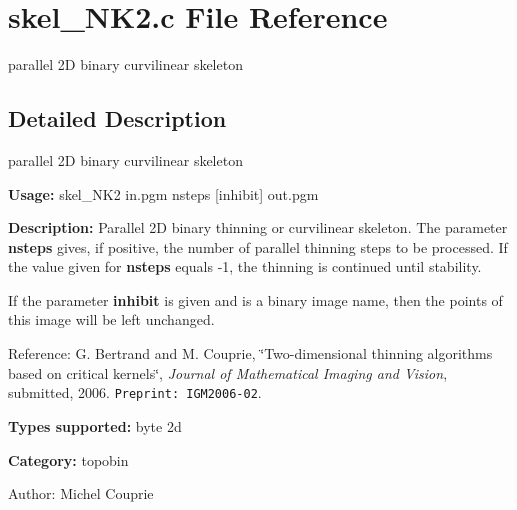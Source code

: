 \section{skel\_\-NK2.c File Reference}
\label{skel__NK2_8c}
parallel 2D binary curvilinear skeleton 



\subsection{Detailed Description}
parallel 2D binary curvilinear skeleton 

{\bf Usage:} skel\_\-NK2 in.pgm nsteps [inhibit] out.pgm

{\bf Description:} Parallel 2D binary thinning or curvilinear skeleton. The parameter {\bf nsteps} gives, if positive, the number of parallel thinning steps to be processed. If the value given for {\bf nsteps} equals -1, the thinning is continued until stability.

If the parameter {\bf inhibit} is given and is a binary image name, then the points of this image will be left unchanged.

Reference: G. Bertrand and M. Couprie, \char`\"{}Two-dimensional thinning algorithms based on critical kernels\char`\"{}, {\em  Journal of Mathematical Imaging and Vision\/}, submitted, 2006. {\tt Preprint: IGM2006-02}.

{\bf Types supported:} byte 2d

{\bf Category:} topobin

\begin{Desc}
\item[Author:]Michel Couprie \end{Desc}
